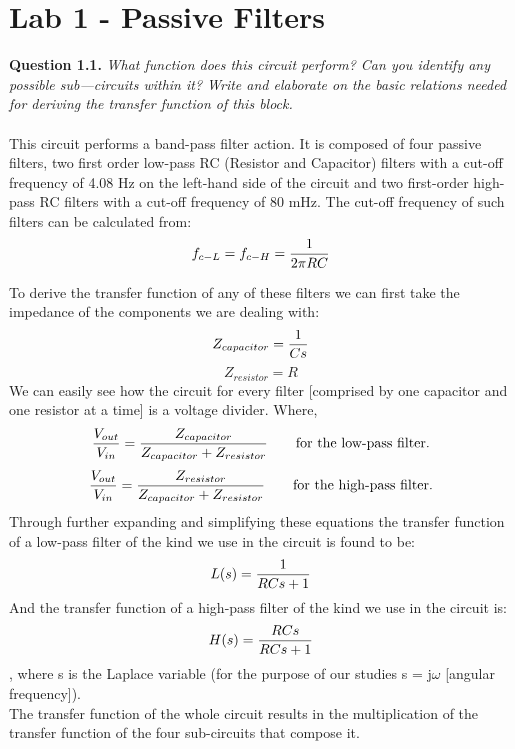 \documentclass[12pt,twoside]{article}
\begin{document}



\section{Lab 1 - Passive Filters}
\textbf{Question 1.1.} \textit{What function does this circuit perform? Can you identify any possible sub---circuits
within it? Write and elaborate on the basic relations needed for deriving the transfer
function of this block.}\\\\
This circuit performs a band-pass filter action. It is composed of four passive filters, two first order low-pass RC (Resistor and Capacitor) filters with a cut-off frequency of 4.08 Hz on the left-hand side of the circuit and two first-order high-pass RC filters with a cut-off frequency of 80 mHz. The cut-off frequency of such filters can be calculated from:$$ f_{c-L} = f_{c-H} = {1 \over 2\pi RC}$$

To derive the transfer function of any of these filters we can first take the impedance of the components we are dealing with:
$$Z_{capacitor} = {1\over Cs}$$
$$Z_{resistor} = R$$
We can easily see how the circuit for every filter [comprised by one capacitor and one resistor at a time] is a voltage divider.
Where, $${V_{out} \over V_{in} }={ {Z_{capacitor}}\over {Z_{capacitor}+Z_{resistor}}}\qquad \text {for the low-pass filter.}$$ 
$${V_{out} \over V_{in} }={ {Z_{resistor}}\over {Z_{capacitor}+Z_{resistor}}}\qquad \text{for the high-pass filter.}$$ 
Through further expanding and simplifying these equations
the transfer function of a low-pass filter of the kind we use in the circuit is found to be:$$ L(s) = {1 \over RCs+1}$$
And the transfer function of a high-pass filter of the kind we use in the circuit is: $$ H(s) = {RCs \over RCs+1}$$
, where s is the Laplace variable (for the purpose of our studies s = j$\omega$ [angular frequency]).
$$$$The transfer function of the whole circuit results in the multiplication of the transfer function of the four sub-circuits that compose it.
\newpage
\end{document}

